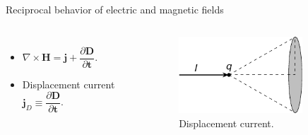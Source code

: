 \begin{frame}{Reciprocal behavior of electric and magnetic fields}
\begin{columns}
        \begin{itemize}
            \item \( \nabla \times \mathbf{H} = \mathbf{j} + \dfrac{\partial \mathbf{D}}{\partial \mathbf{t}} \).
            \item Displacement current \( \mathbf{j}_D \equiv \dfrac{\partial \mathbf{D}}{\partial \mathbf{t}} \).
        \end{itemize}
        \vspace{-1mm}
        \begin{figure}[!htb]
        \centering
        \includegraphics[width=0.8\textwidth]{Figures/Displacement_current.pdf}
        \caption{Displacement current.\cite{Purcell_Morin_2013}}
        \label{Displacement_current}
        \end{figure}
    \end{columns}
\end{frame}